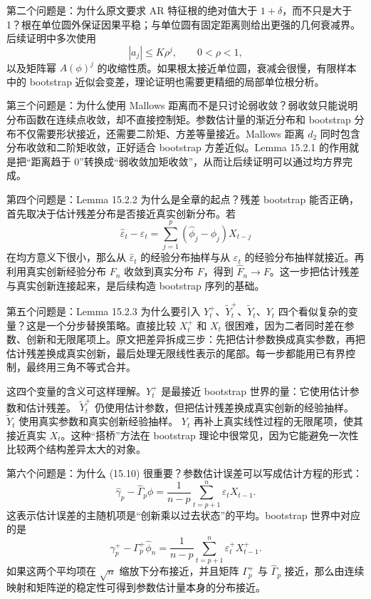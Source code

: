 \documentclass[11pt,a4paper]{ctexart}
\begin{document}
第二个问题是：为什么原文要求 AR 特征根的绝对值大于 \(1+\delta\)，而不只是大于 1？根在单位圆外保证因果平稳；与单位圆有固定距离则给出更强的几何衰减界。后续证明中多次使用
\[
  |a_j|\le K\rho^j,\qquad 0<\rho<1,
\]
以及矩阵幂 \(A(\phi)^j\) 的收缩性质。如果根太接近单位圆，衰减会很慢，有限样本中的 bootstrap 近似会变差，理论证明也需要更精细的局部单位根分析。

第三个问题是：为什么使用 Mallows 距离而不是只讨论弱收敛？弱收敛只能说明分布函数在连续点收敛，却不直接控制矩。参数估计量的渐近分布和 bootstrap 分布不仅需要形状接近，还需要二阶矩、方差等量接近。Mallows 距离 \(d_2\) 同时包含分布收敛和二阶矩收敛，正好适合 bootstrap 方差近似。Lemma 15.2.1 的作用就是把“距离趋于 0”转换成“弱收敛加矩收敛”，从而让后续证明可以通过均方界完成。

第四个问题是：Lemma 15.2.2 为什么是全章的起点？残差 bootstrap 能否正确，首先取决于估计残差分布是否接近真实创新分布。若
\[
  \hat\varepsilon_t-\varepsilon_t
  =\sum_{j=1}^p(\hat\phi_j-\phi_j)X_{t-j}
\]
在均方意义下很小，那么从 \(\hat\varepsilon_t\) 的经验分布抽样与从 \(\varepsilon_t\) 的经验分布抽样就接近。再利用真实创新经验分布 \(F_n\) 收敛到真实分布 \(F\)，得到 \(\hat F_n\to F\)。这一步把估计残差与真实创新连接起来，是后续构造 bootstrap 序列的基础。

第五个问题是：Lemma 15.2.3 为什么要引入 \(Y_t^+\)、\(\widetilde Y_t^+\)、\(\widetilde Y_t\)、\(Y_t\) 四个看似复杂的变量？这是一个分步替换策略。直接比较 \(X_t^+\) 和 \(X_t\) 很困难，因为二者同时差在参数、创新和无限尾项上。原文把差异拆成三步：先把估计参数换成真实参数，再把估计残差换成真实创新，最后处理无限线性表示的尾部。每一步都能用已有界控制，最终用三角不等式合并。

这四个变量的含义可这样理解。\(Y_t^+\) 是最接近 bootstrap 世界的量：它使用估计参数和估计残差。 \(\widetilde Y_t^+\) 仍使用估计参数，但把估计残差换成真实创新的经验抽样。 \(\widetilde Y_t\) 使用真实参数和真实创新经验抽样。 \(Y_t\) 再补上真实线性过程的无限尾项，使其接近真实 \(X_t\)。这种“搭桥”方法在 bootstrap 理论中很常见，因为它能避免一次性比较两个结构差异太大的对象。

第六个问题是：为什么 (15.10) 很重要？参数估计误差可以写成估计方程的形式：
\[
  \hat\gamma_p-\hat\Gamma_p\phi
  =\frac1{n-p}\sum_{t=p+1}^n\varepsilon_tX_{t-1}.
\]
这表示估计误差的主随机项是“创新乘以过去状态”的平均。bootstrap 世界中对应的是
\[
  \gamma_p^+-\Gamma_p^+\hat\phi_n
  =\frac1{n-p}\sum_{t=p+1}^n\varepsilon_t^+X_{t-1}^+.
\]
如果这两个平均项在 \(\sqrt n\) 缩放下分布接近，并且矩阵 \(\Gamma_p^+\) 与 \(\hat\Gamma_p\) 接近，那么由连续映射和矩阵逆的稳定性可得到参数估计量本身的分布接近。
\end{document}
